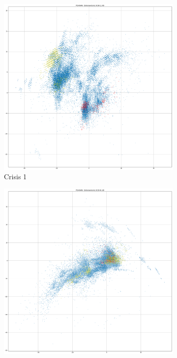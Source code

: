 \documentclass[a4paper,12pt,twoside,oldfontcommands]{memoir}
\begin{document}
\begin{figure}
    \centering
    \begin{subfigure}[b]{0.45\textwidth}
        \includegraphics[width=\textwidth]{images/PCA-crisis1.png}
        \caption{Crisis 1}
        \label{fig:pca_crisis1}
    \end{subfigure}
    \begin{subfigure}[b]{0.45\textwidth}
        \includegraphics[width=\textwidth]{images/PCA-crisis2.png}

\end{subfigure}
\end{figure}
\end{document}
